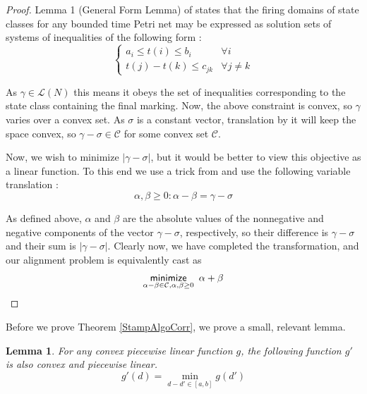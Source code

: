 \documentclass[conference]{IEEEtran}
\newcounter{cases}
\newtheorem{lemma}[theorem]{Lemma}
\begin{document}
	\begin{proof}
		Lemma 1 (General Form Lemma) of \cite{BM82} states that the firing domains of state classes for any bounded time Petri net may be expressed as solution sets of systems of inequalities of the following form :  $$\begin{cases}
			a_i \leq t(i) \leq b_i & \forall i \\ 
			t(j) - t(k) \leq c_{jk} & \forall j \neq k
		\end{cases}$$
		
		As $\gamma \in \mathcal{L}(N)$  this means it obeys the set of inequalities corresponding to the state class containing the final marking. Now, the above constraint is convex, so $\gamma$ varies over a convex set. As $\sigma$ is a constant vector, translation by it will keep the space convex, so $\gamma - \sigma \in \mathcal{C}$ for some convex set $\mathcal{C}$. 
		
		Now, we wish to minimize $|\gamma - \sigma|$, but it would be better to view this objective as a linear function. To this end we use a trick from \cite{BV2014} and use the following variable translation : $$\alpha, \beta \geq 0 : \alpha - \beta = \gamma - \sigma$$
		
		As defined above, $\alpha$ and $\beta$ are the absolute values of the nonnegative and negative components of the vector $\gamma - \sigma$, respectively, so their difference is $\gamma - \sigma$ and their sum is $|\gamma - \sigma|$. Clearly now, we have completed the transformation, and our alignment problem is equivalently cast as $$\underset{\alpha - \beta \in \mathcal{C}, \alpha, \beta \geq 0}{\mathsf{minimize}} \hspace{0.5em} \alpha + \beta  $$
		
	\end{proof}
	
	Before we prove Theorem \ref{StampAlgoCorr}, we prove a small, relevant lemma. 
	
	\begin{lemma}\label{minpwc}
		For any convex piecewise linear function $g$, the following function $g'$ is also convex and piecewise linear. 
		$$g'(d) = \min_{d-d' \in [a,b]} g(d')$$
		
	\end{lemma}
	
\end{document}
